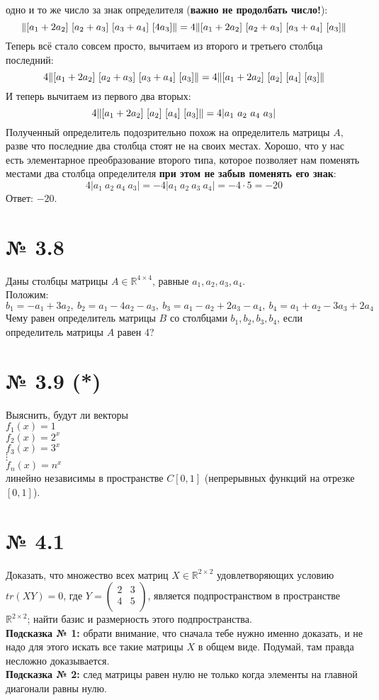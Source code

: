 \documentclass[a4paper,11pt]{report}
\begin{document}
одно и то же число за знак определителя (\textbf{важно не продолбать число!}):
\[
\Arrowvert[a_1 + 2a_2]\ [a_2 + a_3]\ [a_3 + a_4]\ [4a_3]\Arrowvert =
4\Arrowvert[a_1 + 2a_2]\ [a_2 + a_3]\ [a_3 + a_4]\ [a_3]\Arrowvert
\]
Теперь всё стало совсем просто, вычитаем из второго и третьего столбца последний:
\[
4\Arrowvert[a_1 + 2a_2]\ [a_2 + a_3]\ [a_3 + a_4]\ [a_3]\Arrowvert =
4\Arrowvert[a_1 + 2a_2]\ [a_2]\ [a_4]\ [a_3]\Arrowvert
\]
И теперь вычитаем из первого два вторых:
\[
4\Arrowvert[a_1 + 2a_2]\ [a_2]\ [a_4]\ [a_3]\Arrowvert =
4|a_1\ a_2\ a_4\ a_3|
\]
Полученный определитель подозрительно похож на определитель матрицы $A$, разве что последние два столбца стоят не на своих
местах. Хорошо, что у нас есть элементарное преобразование второго типа, которое позволяет нам поменять местами два столбца
определителя \textbf{при этом не забыв поменять его знак}:
\[
4|a_1\ a_2\ a_4\ a_3| = 
-4|a_1\ a_2\ a_3\ a_4| =
-4 \cdot 5 = -20
\]
Ответ: $-20$.
\section{№ 3.8}
Даны столбцы матрицы $A \in \mathbb{R}^{4\times4}$, равные $a_1, a_2, a_3, a_4$.\\
Положим:
\[
b_1 = -a_1 + 3a_2,\ 
b_2 = a_1 - 4a_2 - a_3,\ 
b_3 = a_1 - a_2 + 2a_3 - a_4,\ 
b_4 = a_1 + a_2 - 3a_3 + 2a_4
\]
Чему равен определитель матрицы $B$ со столбцами $b_1, b_2, b_3, b_4$, если определитель матрицы
$A$ равен 4?
\section{№ 3.9 (*)} 
Выяснить, будут ли векторы\\
$f_1(x) = 1$\\
$f_2(x) = 2^x$\\
$f_3(x) = 3^x$\\
$\vdots$\\
$f_n(x) = n^x$\\
линейно независимы в пространстве $C[0, 1]$ (непрерывных функций на отрезке $[0, 1]$).
\section{№ 4.1}
Доказать, что множество всех матриц $X \in \mathbb{R}^{2\times2}$ удовлетворяющих условию $tr(XY) = 0$, где
$Y = 
\begin{pmatrix}
2 & 3\\
4 & 5\\
\end{pmatrix}
$, является подпространством в пространстве $\mathbb{R}^{2\times2}$; найти базис и размерность этого подпространства.\\
\textbf{Подсказка № 1:} обрати внимание, что сначала тебе нужно именно доказать, и не надо для этого искать все такие матрицы 
$X$ в общем виде. Подумай, там правда несложно доказывается.\\
\textbf{Подсказка № 2:} след матрицы равен нулю не только когда элементы на главной диагонали равны нулю.
\end{document}
